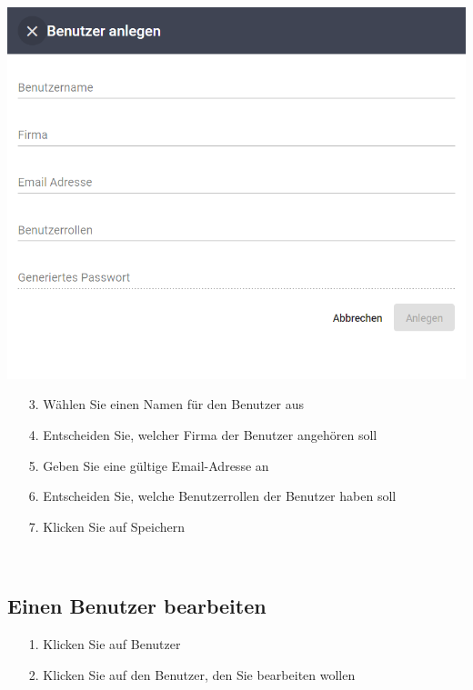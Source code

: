 \documentclass[11pt,a4paper]{report}
\begin{document}
	\begin{minipage}{0.5\linewidth}
	\includegraphics[width=\linewidth]{Benutzer.png}
	\end{minipage}
	\hfill
	\begin{minipage}{0.4\linewidth}
	\begin{itemize}
		\item[3.] Wählen Sie einen Namen für den Benutzer aus
		\item[4.] Entscheiden Sie, welcher Firma der Benutzer angehören soll
		\item[5.] Geben Sie eine gültige Email-Adresse an
		\item[6.] Entscheiden Sie, welche Benutzerrollen der Benutzer haben soll
		\item[7.] Klicken Sie auf Speichern
	\end{itemize}
	\end{minipage}\\

	\subsection{Einen Benutzer bearbeiten}

		\begin{itemize}
		\item[1.] Klicken Sie auf \glqq{}Benutzer\grqq{}
		\item[2.] Klicken Sie auf den Benutzer, den Sie bearbeiten wollen
	\end{itemize}
\end{document}
